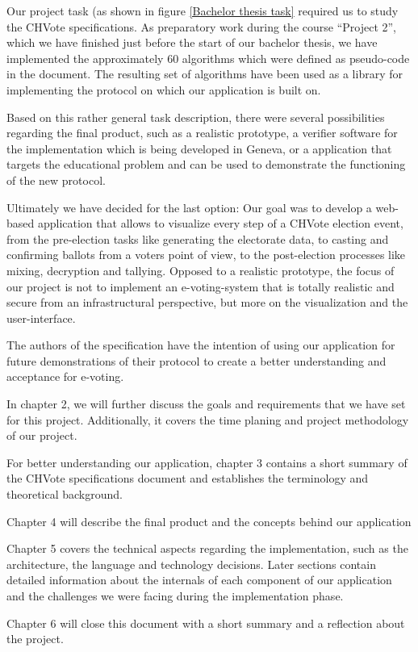 Our project task (as shown in figure \ref{Bachelor thesis task} required us to study the CHVote specifications. As preparatory work during the course "`Project 2"', which we have finished just before the start of our bachelor thesis, we have implemented the approximately 60 algorithms which were defined as pseudo-code in the document. The resulting set of algorithms have been used as a library for implementing the protocol on which our application is built on.

Based on this rather general task description, there were several possibilities regarding the final product, such as a realistic prototype, a verifier software for the implementation which is being developed in Geneva, or a application that targets the educational problem and can be used to demonstrate the functioning of the new protocol.

Ultimately we have decided for the last option: Our goal was to develop a web-based application that allows to visualize every step of a CHVote election event, from the pre-election tasks like generating the electorate data, to casting and confirming ballots from a voters point of view, to the post-election processes like mixing, decryption and tallying. Opposed to a realistic prototype, the focus of our project is not to implement an e-voting-system that is totally realistic and secure from an infrastructural perspective, but more on the visualization and the user-interface.

The authors of the specification have the intention of using our application for future demonstrations of their protocol to create a better understanding and acceptance for e-voting.

In chapter 2, we will further discuss the goals and requirements that we have set for this project. Additionally, it covers the time planing and project methodology of our project.

For better understanding our application, chapter 3 contains a short summary of the CHVote specifications document and establishes the terminology and theoretical background.

Chapter 4 will describe the final product and the concepts behind our application

Chapter 5 covers the technical aspects regarding the implementation, such as the architecture, the language and technology decisions. Later sections contain detailed information about the internals of each component of our application and the challenges we were facing during the implementation phase.

Chapter 6 will close this document with a short summary and a reflection about the project.
